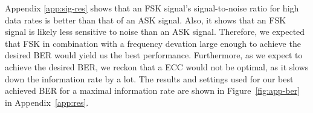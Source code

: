 \documentclass[11pt,titlepage]{report}
\begin{document}
Appendix \ref{app:sig-res} shows that an FSK signal's signal-to-noise ratio for high data rates is better than that of an ASK signal. Also, it shows that an FSK signal is likely less sensitive to noise than an ASK signal. Therefore, we expected that FSK in combination with a frequency devation large enough to achieve the desired BER would yield us the best performance. Furthermore, as we expect to achieve the desired BER, we reckon that a ECC would not be optimal, as it slows down the information rate by a lot. The results and settings used for our best achieved BER for a maximal information rate are shown in Figure~\ref{fig:app-ber} in Appendix~\ref{app:res}.
\end{document}
